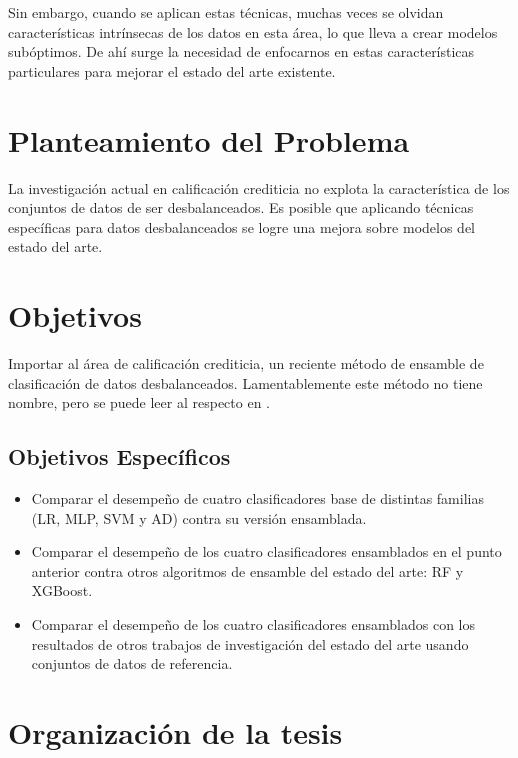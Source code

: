 Sin embargo, cuando se aplican estas técnicas, muchas veces se olvidan características intrínsecas de los datos en esta área, lo que lleva a crear modelos subóptimos. De ahí surge la necesidad de enfocarnos en estas características particulares para mejorar el estado del arte existente.

\section{Planteamiento del Problema}

La investigación actual en calificación crediticia no explota la característica de los conjuntos de datos de ser desbalanceados. Es posible que aplicando técnicas específicas para datos desbalanceados se logre una mejora sobre modelos del estado del arte.

\section{Objetivos}

Importar al área de calificación crediticia, un reciente método de ensamble de clasificación de datos desbalanceados. Lamentablemente este método no tiene nombre, pero se puede leer al respecto en \cite{sun2015novel}.

\subsection{Objetivos Específicos}

\begin{itemize}
	\item Comparar el desempeño de cuatro clasificadores base de distintas familias (\ac{LR}, \ac{MLP}, \ac{SVM} y \ac{AD}) contra su versión ensamblada.

	\item Comparar el desempeño de los cuatro clasificadores ensamblados en el punto anterior contra otros algoritmos de ensamble del estado del arte: \ac{RF} y \ac{XGBoost}.

	\item Comparar el desempeño de los cuatro clasificadores ensamblados con los resultados de otros trabajos de investigación del estado del arte usando conjuntos de datos de referencia.
\end{itemize}

\section{Organización de la tesis}

